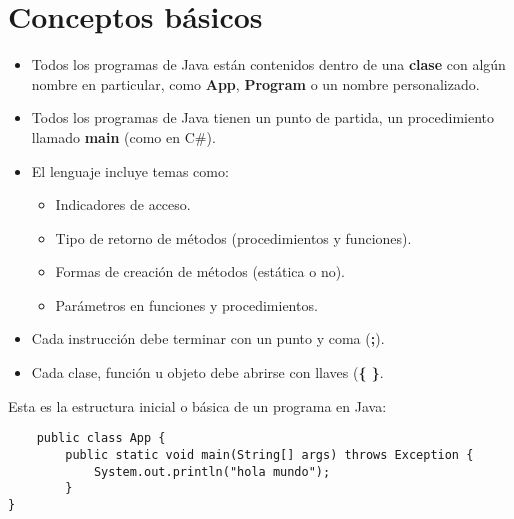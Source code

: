 \section{Conceptos básicos}
\begin{itemize}
    \item Todos los programas de Java están contenidos dentro de una \textbf{clase} con algún nombre en particular, como \textbf{App}, \textbf{Program} o un nombre personalizado.
    \item Todos los programas de Java tienen un punto de partida, un procedimiento llamado \textbf{main} (como en C\#).
    \item El lenguaje incluye temas como:
    \begin{itemize}
        \item Indicadores de acceso.
        \item Tipo de retorno de métodos (procedimientos y funciones).
        \item Formas de creación de métodos (estática o no).
        \item Parámetros en funciones y procedimientos.
    \end{itemize}
    \item Cada instrucción debe terminar con un punto y coma (\textbf{;}).
    \item Cada clase, función u objeto debe abrirse con llaves (\textbf{\{ \}}.
\end{itemize}
Esta es la estructura inicial o básica de un programa en Java:
\begin{lstlisting}
    public class App {
        public static void main(String[] args) throws Exception {
            System.out.println("hola mundo");
        }
}
\end{lstlisting}



